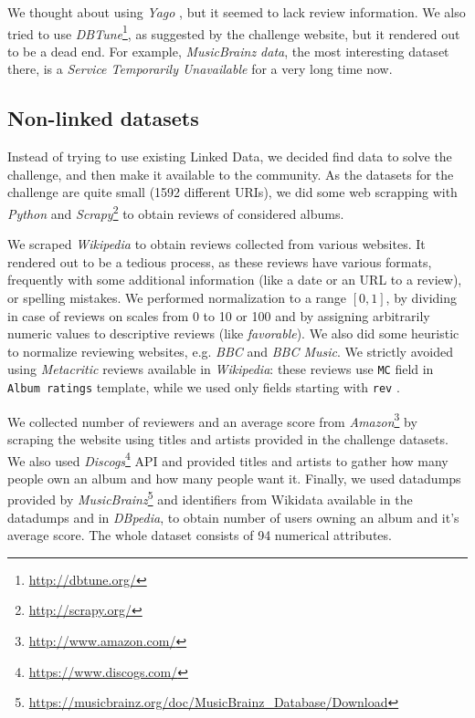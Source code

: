 \documentclass{llncs}
\begin{document}
We thought about using \emph{Yago} \cite{yago}, but it seemed to lack review information.
We also tried to use \emph{DBTune}\footnote{\url{http://dbtune.org/}}, as suggested by the challenge website, but it rendered out to be a dead end.
For example, \emph{MusicBrainz data}, the most interesting dataset there, is a \emph{Service Temporarily Unavailable} for a very long time now.

\subsection{Non-linked datasets\label{sec:nonld}}
Instead of trying to use existing Linked Data, we decided find data to solve the challenge, and then make it available to the community.
As the datasets for the challenge are quite small (1592 different URIs), we did some web scrapping with \emph{Python} and \emph{Scrapy}\footnote{\url{http://scrapy.org/}} to obtain reviews of considered albums.

We scraped \emph{Wikipedia} to obtain reviews collected from various websites.
It rendered out to be a tedious process, as these reviews have various formats, frequently with some additional information (like a date or an URL to a review), or spelling mistakes.
We performed normalization to a range $\left[0,1\right]$, by dividing in case of reviews on scales from 0 to 10 or 100 and by assigning arbitrarily numeric values to descriptive reviews (like \emph{favorable}).
We also did some heuristic to normalize reviewing websites, e.g. \emph{BBC} and \emph{BBC Music}.
We strictly avoided using \emph{Metacritic} reviews available in \emph{Wikipedia}: these reviews use \texttt{MC} field in \texttt{Album ratings} template, while we used only fields starting with \texttt{rev} \cite{album_ratings}.

We collected number of reviewers and an average score from \emph{Amazon}\footnote{\url{http://www.amazon.com/}} by scraping the website using titles and artists provided in the challenge datasets.
We also used \emph{Discogs}\footnote{\url{https://www.discogs.com/}} API and provided titles and artists to gather how many people own an album and how many people want it.
Finally, we used datadumps provided by \emph{MusicBrainz}\footnote{\url{https://musicbrainz.org/doc/MusicBrainz_Database/Download}} \cite{musicbrainz} and identifiers from Wikidata \cite{wikidata} available in the datadumps and in \emph{DBpedia}, to obtain number of users owning an album and it's average score.
The whole dataset consists of 94 numerical attributes.
\end{document}
